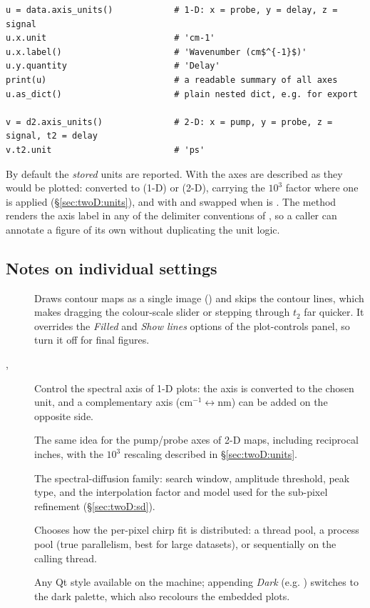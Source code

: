 \begin{lstlisting}
u = data.axis_units()            # 1-D: x = probe, y = delay, z = signal
u.x.unit                         # 'cm-1'
u.x.label()                      # 'Wavenumber (cm$^{-1}$)'
u.y.quantity                     # 'Delay'
print(u)                         # a readable summary of all axes
u.as_dict()                      # plain nested dict, e.g. for export

v = d2.axis_units()              # 2-D: x = pump, y = probe, z = signal, t2 = delay
v.t2.unit                        # 'ps'
\end{lstlisting}

By default the \emph{stored} units are reported. With  the
axes are described as they would be plotted: converted to
 (1-D) or  (2-D), carrying the
$10^3$ factor where one is applied (\S\ref{sec:twoD:units}), and with 
and  swapped when  is . The
 method renders the axis label in any of the delimiter
conventions of , so a caller can annotate a figure of its own
without duplicating the unit logic.

\subsection{Notes on individual settings}
\begin{description}
  \item[] Draws contour maps as a single image
    () and skips the contour lines, which makes dragging the
    colour-scale slider or stepping through $t_2$ far quicker. It overrides the
    \emph{Filled} and \emph{Show lines} options of the plot-controls panel, so
    turn it off for final figures.
  \item[, ] Control the spectral axis
    of 1-D plots: the axis is converted to the chosen unit, and a complementary
    axis (cm$^{-1}\leftrightarrow$nm) can be added on the opposite side.
  \item[] The same idea for the pump/probe axes of 2-D
    maps, including reciprocal inches, with the $10^3$ rescaling described in
    \S\ref{sec:twoD:units}.
  \item[] The spectral-diffusion family: search window, amplitude
    threshold, peak type, and the interpolation factor and model used for the
    sub-pixel refinement (\S\ref{sec:twoD:sd}).
  \item[] Chooses how the per-pixel chirp fit is
    distributed: a thread pool, a process pool (true parallelism, best for large
    datasets), or sequentially on the calling thread.
  \item[] Any Qt style available on the machine; appending
    \emph{Dark} (e.g. ) switches to the dark palette, which
    also recolours the embedded plots.
\end{description}
